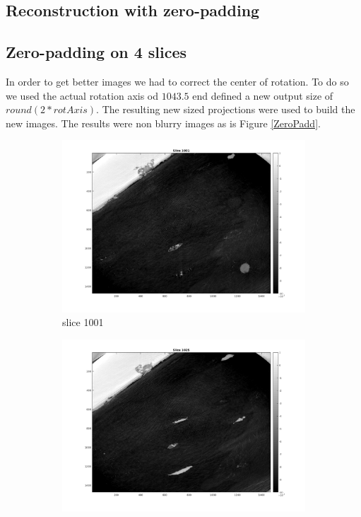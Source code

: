 \documentclass[10pt,a4paper,titlepage]{article}
\begin{document}
    
    \clearpage
	\subsection{Reconstruction with zero-padding}
	
		\subsection{Zero-padding on 4 slices}
			In order to get better images we had to correct the center of rotation. To do so we used the actual rotation axis od $1043.5$ end defined a new output size of $round(2*rotAxis)$. The resulting new sized projections were used to build the new images. The results were non blurry images as is Figure \ref{ZeroPadd}.
			
			\begin{figure}[h!]
        \centering	
			\begin{subfigure}[b]{0.475\textwidth}
            \centering
            \includegraphics[width=\textwidth]{with0pad/slice1001.png}
            \caption{slice 1001}
        \end{subfigure}
        \hfill
        \begin{subfigure}[b]{0.475\textwidth}  
            \centering 
            \includegraphics[width=\textwidth]{with0pad/slice1025.png}

\end{subfigure}
\end{figure}
\end{document}
